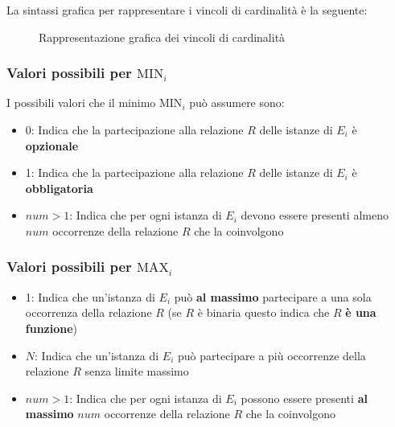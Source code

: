 \documentclass[a4paper,twoside]{article}
\begin{document}
\vspace{1em}
\noindent
La sintassi grafica per rappresentare i vincoli di cardinalità è la seguente:
\begin{figure}[H]
  \centering
  \caption{Rappresentazione grafica dei vincoli di cardinalità}
\end{figure}

\subsubsection{Valori possibili per \texorpdfstring{\( \text{MIN}_i \)}{MIN\_i}}
I possibili valori che il minimo \( \text{MIN}_i \) può assumere sono:
\begin{itemize}
  \item 0: Indica che la partecipazione alla relazione \( R \) delle istanze di \( E_i \)
    è \textbf{opzionale}

  \item 1: Indica che la partecipazione alla relazione \( R \) delle istanze di \( E_i \)
    è \textbf{obbligatoria}

  \item \( num > 1 \): Indica che per ogni istanza di \( E_i \) devono essere presenti
    almeno \( num \) occorrenze della relazione \( R \) che la coinvolgono
\end{itemize}

\subsubsection{Valori possibili per \texorpdfstring{\( \text{MAX}_i \)}{MAX\_i}}
\begin{itemize}
  \item 1: Indica che un'istanza di \( E_i \) può \textbf{al massimo} partecipare a una
    sola occorrenza della relazione \( R \) (se \( R \) è binaria questo indica che \( R \)
    \textbf{è una funzione})

  \item \( N \): Indica che un'istanza di \( E_i \) può partecipare a più occorrenze
    della relazione \( R \) senza limite massimo

  \item \( num > 1 \): Indica che per ogni istanza di \( E_i \) possono essere presenti
    \textbf{al massimo} \( num \) occorrenze della relazione \( R \) che la coinvolgono
\end{itemize}
\end{document}
